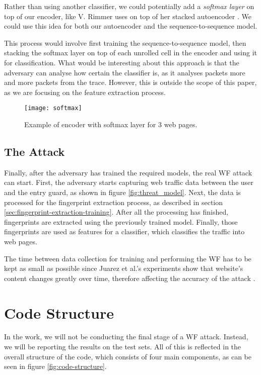 Rather than using another classifier, we could potentially add a \textit{softmax layer} on top of our encoder, like V. Rimmer uses on top of her stacked autoencoder \cite{deeplearningthesis}.
We could use this idea for both our autoencoder and the sequence-to-sequence model.

This process would involve first training the sequence-to-sequence model, then stacking the softmax layer on top of each unrolled cell in the encoder and using it for classification.
What would be interesting about this approach is that the adversary can analyse how certain the classifier is, as it analyses packets more and more packets from the trace.
However, this is outside the scope of this paper, as we are focusing on the feature extraction process.

\begin{figure}[ht]
  \centering
  \texttt{[image: softmax]}
  \caption{Example of encoder with softmax layer for 3 web pages.}
  \label{fig:softmax}
\end{figure}

\newpage

\subsection{The Attack}

Finally, after the adversary has trained the required models, the real WF attack can start.
First, the adversary starts capturing web traffic data between the user and the entry guard, as shown in figure \ref{fig:threat_model}.
Next, the data is processed for the fingerprint extraction process, as described in section \ref{sec:fingerprint-extraction-training}.
After all the processing has finished, fingerprints are extracted using the previously trained model.
Finally, those fingerprints are used as features for a classifier, which classifies the traffic into web pages.

The time between data collection for training and performing the WF has to be kept as small as possible since Juarez et al.'s experiments show that website's content changes greatly over time, therefore affecting the accuracy of the attack \cite{wfpevaluation}.

\section{Code Structure} \label{sec:code-structure}

In the work, we will not be conducting the final stage of a WF attack.
Instead, we will be reporting the results on the test sets.
All of this is reflected in the overall structure of the code, which consists of four main components, as can be seen in figure \ref{fig:code-structure}.

